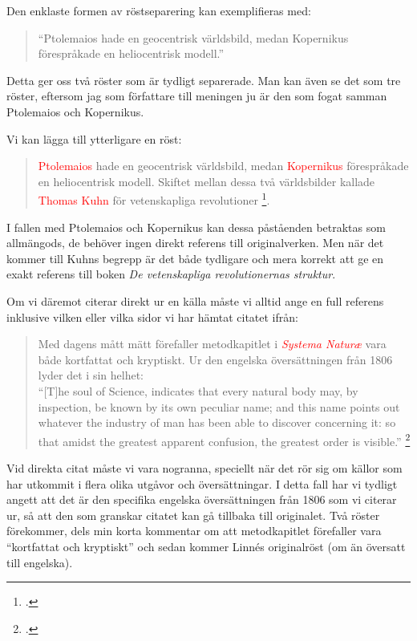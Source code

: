 \documentclass[11pt,a5paper,footinclude=true,headinclude=true]{scrbook} %
\begin{document}
Den enklaste formen av röstseparering kan exemplifieras med:

\begin{quote}
``Ptolemaios hade en geocentrisk världsbild, medan Kopernikus förespråkade en heliocentrisk modell.''
\end{quote}

\noindent Detta ger oss två röster som är tydligt separerade. Man kan även se det som tre röster, eftersom jag som författare till meningen ju är den som fogat samman Ptolemaios och Kopernikus. 

Vi kan lägga till ytterligare en röst:

\begin{quote}
\textcolor{red}{Ptolemaios} hade en geocentrisk världsbild, medan \textcolor{red}{Kopernikus} förespråkade en heliocentrisk modell. Skiftet mellan dessa två världsbilder kallade \textcolor{red}{Thomas Kuhn} för vetenskapliga revolutioner \footcite{kuhnVetenskapligaRevolutionernasStruktur1979}.
\end{quote}

\noindent I fallen med Ptolemaios och Kopernikus kan dessa påståenden betraktas som allmängods, de behöver ingen direkt referens till originalverken. Men när det kommer till Kuhns begrepp är det både tydligare och mera korrekt att ge en exakt referens till boken \emph{De vetenskapliga revolutionernas struktur}.

Om vi däremot citerar direkt ur en källa måste vi alltid ange en full referens inklusive vilken eller vilka sidor vi har hämtat citatet ifrån:

\begin{quote}
\begin{footnotesize}
Med dagens mått mätt förefaller metodkapitlet i \textcolor{red}{\emph{Systema Naturæ}} vara både kortfattat och kryptiskt. Ur den engelska översättningen från 1806 lyder det i sin helhet: 
\\ 
``[T]he soul of Science, indicates that every natural body may, by inspection, be known by its own peculiar name; and this name points out whatever the industry of man has been able to discover concerning it: so that amidst the greatest apparent confusion, the greatest order is visible.'' \footcite[s. 3]{linneGeneralSystemNature1806}
\end{footnotesize}
\end{quote}

\noindent Vid direkta citat måste vi vara nogranna, speciellt när det rör sig om källor som har utkommit i flera olika utgåvor och översättningar. I detta fall har vi tydligt angett att det är den specifika engelska översättningen från 1806 som vi citerar ur, så att den som granskar citatet kan gå tillbaka till originalet. Två röster förekommer, dels min korta kommentar om att metodkapitlet förefaller vara ``kortfattat och kryptiskt'' och sedan kommer Linnés originalröst (om än översatt till engelska).
\end{document}
